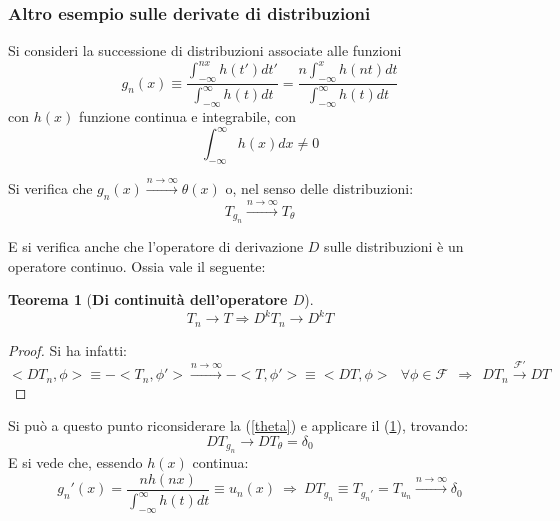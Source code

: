 \documentclass[twoside]{article}
\newtheorem{theorem}{Teorema}[section]
\begin{document}
\subsubsection{Altro esempio sulle derivate di distribuzioni}
Si consideri la successione di distribuzioni associate alle funzioni
\begin{equation}
    g_n(x)\equiv \frac{\int_{-\infty}^{nx}h(t')dt'}{\int_{-\infty}^{\infty}h(t)dt}=\frac{n\int_{-\infty}^{x}h(nt)dt}{\int_{-\infty}^{\infty}h(t)dt}
\end{equation}
con $h(x)$ funzione continua e integrabile, con 
\begin{equation}
    \int_{-\infty}^{\infty}h(x)dx \ne 0
\end{equation}

Si verifica che $g_n(x) \xrightarrow{n\to \infty}\theta(x)$ o, nel senso delle distribuzioni:
\begin{equation}\label{theta}
    T_{g_{n}}\xrightarrow{n\to \infty}T_{\theta}
\end{equation}

E si verifica anche che l'operatore di derivazione $D$ sulle distribuzioni è un operatore continuo. Ossia vale il seguente:

\begin{theorem}[\textbf{Di continuità dell'operatore $D$}]\label{continuità derivata}
\begin{equation}
    T_n\to T\Longrightarrow  D^k T_n \to D^k T
\end{equation}
\end{theorem}

\begin{proof}
Si ha infatti:
\begin{equation}
    <DT_n,\phi>\equiv -<T_n,\phi'> \xrightarrow{n\to \infty}-<T,\phi'> \equiv <DT,\phi> \ \ \ \forall \phi \in \mathcal{F} \ \ \Rightarrow \ \ DT_n \xrightarrow{\mathcal{F}'}DT
\end{equation}

\end{proof}

Si può a questo punto riconsiderare la (\ref{theta}) e applicare il (\ref{continuità derivata}), trovando:
\begin{equation}
    DT_{g_{n}}\to DT_{\theta}=\delta_0
\end{equation}
E si vede che, essendo $h(x)$ continua:
\begin{equation}
    g_n '(x)=\frac{nh(nx)}{\int_{-\infty}^{\infty}h(t)dt}\equiv u_n(x) \ \Rightarrow \ DT_{g_{n}} \equiv T_{g_{n}'}=T_{u_{n}} \xrightarrow{n \to \infty} \delta_0
\end{equation}
\end{document}
